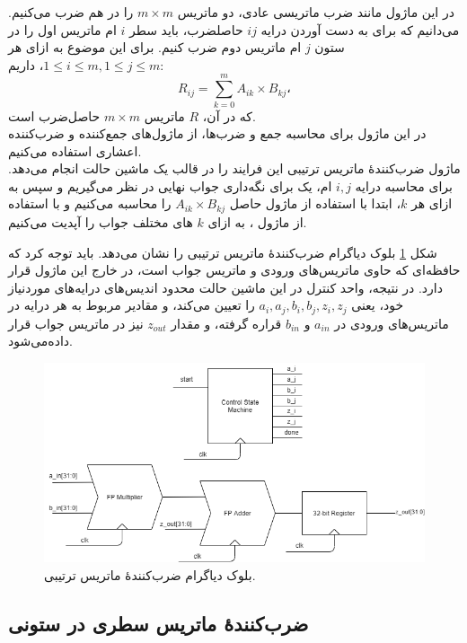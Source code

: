 \documentclass[conference]{IEEEtran-ModifiedForMVIP}
\begin{document}
در این ماژول مانند ضرب ماتریسی عادی، دو ماتریس 
$m \times m$
را در هم ضرب می‌کنیم. می‌دانیم که برای به دست آوردن درایه 
$ij$
حاصلضرب، باید سطر $i$ ام ماتریس اول را در ستون $j$ ام ماتریس دوم ضرب کنیم. برای این موضوع به ازای هر 
$1\leq i\leq m , 1\leq j\leq m $،
داریم:
$$R_{ij} = \sum_{k=0}^m{A_{ik} \times B_{kj}}،$$
که در آن،
$R$
ماتریس
$m \times m$
حاصل‌ضرب است.\\
در این ماژول برای محاسبه جمع و ضرب‌ها، از ماژول‌های جمع‌کننده و ضرب‌کننده اعشاری
 استفاده می‌کنیم.\\
ماژول ضرب‌کنندهٔ ماتریس ترتیبی
 این فرایند را در قالب یک ماشین حالت انجام می‌دهد. برای محاسبه درایه $i,j$ ام، یک 
 برای نگه‌داری جواب نهایی در نظر می‌گیریم و سپس
  به ازای هر $k$، ابتدا با استفاده از ماژول 
  حاصل
$A_{ik}\times B_{kj}$
 را محاسبه می‌کنیم و با استفاده از ماژول
 ، به ازای $k$ های مختلف جواب را آپدیت می‌کنیم.  

شکل
\ref{fig:SequentialBD}
بلوک دیاگرام ضرب‌کنندهٔ ماتریس ترتیبی را نشان می‌دهد.
باید توجه کرد که حافظه‌ای که حاوی ماتریس‌های ورودی و ماتریس جواب است، در خارج این ماژول قرار دارد.
در نتیجه، واحد کنترل در این ماشین حالت محدود
اندیس‌های درایه‌های موردنیاز خود، یعنی
$a_i, a_j, b_i, b_j, z_i, z_j$
را تعیین می‌کند، و مقادیر مربوط به هر درایه در ماتریس‌های ورودی در
$a_{in}$
و
$b_{in}$
قراره گرفته، و مقدار
$z_{out}$
نیز در ماتریس جواب قرار داده‌می‌شود.

\begin{figure}[t]
\centering 
\includegraphics[width=1\linewidth]{Images/SequentialBD.png}
\caption{
\centering
بلوک دیاگرام ضرب‌کنندهٔ ماتریس ترتیبی.
}\label{fig:SequentialBD}
\end{figure}

\subsection{
    ضرب‌کنندهٔ ماتریس سطری در ستونی
}
\end{document}

